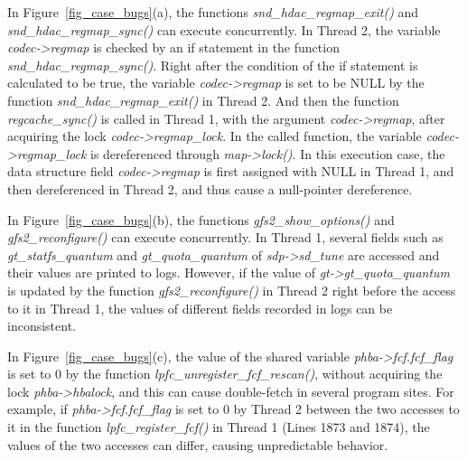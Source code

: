  In 
Figure~\ref{fig_case_bugs}(a), the functions {\em snd\_hdac\_regmap\_exit()} 
and {\em snd\_hdac\_regmap\_sync()} can execute concurrently. In Thread 2, the 
variable {\em codec->regmap} is checked by an if statement in the function {\em 
snd\_hdac\_regmap\_sync()}. Right after the condition of the if statement is 
calculated to be true, the variable {\em codec->regmap} is set to be NULL by 
the function {\em snd\_hdac\_regmap\_exit()} in Thread 2. And then the function 
{\em regcache\_sync()} is called in Thread 1, with the argument {\em 
codec->regmap}, after acquiring the lock {\em codec->regmap\_lock}. In the 
called function, the variable {\em codec->regmap\_lock} is dereferenced through 
{\em map->lock()}. In this execution case, the data structure field {\em 
codec->regmap} is first assigned with NULL in Thread 1, and then dereferenced 
in Thread 2, and thus cause a null-pointer dereference.

 In 
Figure~\ref{fig_case_bugs}(b), the functions {\em gfs2\_show\_options()} and 
{\em gfs2\_reconfigure()} can execute concurrently. In Thread 1, several fields 
such as {\em gt\_statfs\_quantum} and {\em gt\_quota\_quantum} of {\em 
sdp->sd\_tune} are accessed and their values are printed to logs. However, if 
the value of {\em gt->gt\_quota\_quantum} is updated by the function {\em 
gfs2\_reconfigure()} in Thread 2 right before the access to it in Thread 1, the 
values of different fields recorded in logs can be inconsistent.

 In 
Figure~\ref{fig_case_bugs}(c), the value of the shared variable {\em 
phba->fcf.fcf\_flag} is set to 0 by the function {\em 
lpfc\_unregister\_fcf\_rescan()}, without acquiring the lock {\em 
phba->hbalock}, and this can cause double-fetch in several program sites. For 
example, if {\em phba->fcf.fcf\_flag} is set to 0 by Thread 2 between the two 
accesses to it in the function {\em lpfc\_register\_fcf()} in Thread 1 (Lines 
1873 and 1874), the values of the two accesses can differ, causing 
unpredictable behavior.

